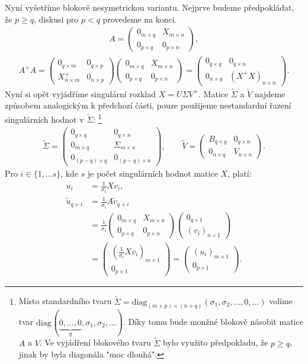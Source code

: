 \documentclass[]{article}
\newcommand{\diag}[2]{\mathrm{diag}_{#1}(#2)}
\newcommand{\mat}[1]{\begin{pmatrix}#1\end{pmatrix}}
\newcommand{\recip}[1]{\frac{1}{#1}}
\newcommand{\x}{\times}
\begin{document}
Nyní vyšetříme blokově nesymetrickou variantu. Nejprve budeme předpokládat, že $p \geq q$, diskusi pro $p < q$ provedeme na konci.
\begin{align*}
  A = \mat{
    0_{m \x q} & X_{m \x n} \\
    0_{p \x q} & 0_{p \x n}
  },
\end{align*}
\begin{align*}
  A^+A = \mat{
    0_{q \x m} & 0_{q \x p} \\
    X^+_{n \x m} & 0_{n \x p}
  }
  \mat{
    0_{m \x q} & X_{m \x n} \\
    0_{p \x q} & 0_{p \x n}
  }
  = \mat{
    0_{q \x q} & 0_{q \x n} \\
    0_{n \x q} & (X^+X)_{n \x n}
  }.
\end{align*}
Nyní si opět vyjádříme singulární rozklad $X = U \Sigma V^+$. Matice $\widetilde{\Sigma}$ a $\widetilde{V}$ najdeme způsobem analogickým k předchozí části, pouze použijeme nestandardní řazení singulárních hodnot v $\widetilde{\Sigma}$:
\footnote{
  Místo standardního tvaru
  $\widetilde{\Sigma} = \diag{(m+p) \x (n+q)}{\sigma_1, \sigma_2, ..., 0, ...}$
  volíme tvar
  $\diag{}{ \underbrace{0, ..., 0}_q, \sigma_1, \sigma_2, ...}$. Díky tomu bude monžné blokově násobit matice $A$ a $V$. Ve vyjádření blokového tvaru $\widetilde{\Sigma}$ bylo využito předpokladu, že $p \geq q$, jinak by byla diagonála "moc dlouhá".
}
\begin{align*}
  \widetilde{\Sigma} = \mat{
    0_{q \x q} & 0_{q \x n} \\
    0_{m \x q} & \Sigma_{m \x n} \\
    0_{(p-q) \x q} & 0_{(p-q) \x n}
  },
  \hspace{2em}
  \widetilde{V}
  = \mat{
    B_{q \x q} & 0_{q \x n} \\
    0_{n \x q} & V_{n \x n}
  }.
\end{align*}
Pro $i \in \{1, ... s\}$, kde $s$ je počet singulárních hodnot matice $X$, platí:
\begin{align*}
  u_i &= \recip{\sigma_i} X v_i,
  \\
  \widetilde{u}_{q+i} &= \recip{\sigma_i} A \widetilde{v}_{q+i} \\
  &= \recip{\sigma_i}
  \mat{
    0_{m \x q} & X_{m \x n} \\
    0_{p \x q} & 0_{p \x n}
  }
  \mat{
    0_{q \x 1} \\ (v_i)_{n \x 1}
  } \\
  &=
  \mat{
    (\recip{\sigma_i} X v_i)_{m \x 1} \\
    0_{p \x 1}
  }
  = \mat{
    (u_i)_{m \x 1} \\
    0_{p \x 1}
  }.
\end{align*}
\end{document}
